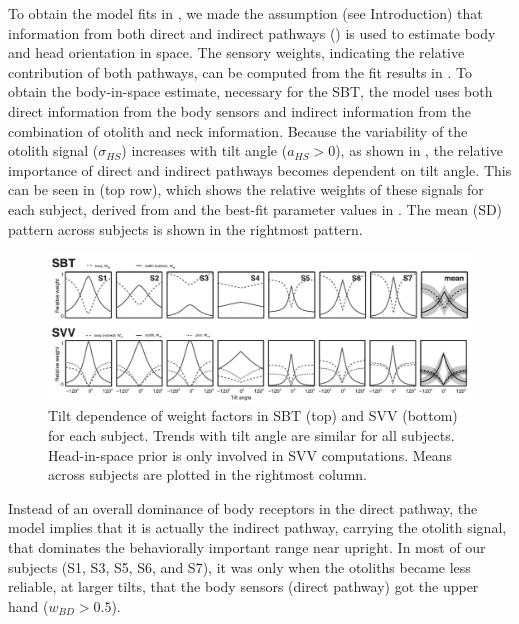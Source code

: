 To obtain the model fits in , we made the assumption (see Introduction) that information from both direct and indirect pathways () is used to estimate body and head orientation in space. The sensory weights, indicating the relative contribution of both pathways, can be computed from the fit results in . To obtain the body-in-space estimate, necessary for the SBT, the model uses both direct information from the body sensors and indirect information from the combination of otolith and neck information. Because the variability of the otolith signal ($\sigma_{HS}$) increases with tilt angle ($a_{HS} > 0$), as shown in , the relative importance of direct and indirect pathways becomes dependent on tilt angle. This can be seen in  (top row), which shows the relative weights of these signals for each subject, derived from  and the best-fit parameter values in . The mean (\textpm SD) pattern across subjects is shown in the rightmost pattern. 

\begin{figure}
    \includegraphics[width=1.0\textwidth]{src/paper1/figure5.pdf}
    
    \caption{Tilt dependence of weight factors in SBT (top) and SVV (bottom) for each subject. Trends with tilt angle are similar for all subjects. Head-in-space prior is only involved in SVV computations. Means across subjects are plotted in the rightmost column.}
    \label{p1:fig5}
\end{figure}

Instead of an overall dominance of body receptors in the direct pathway, the model implies that it is actually the indirect pathway, carrying the otolith signal, that dominates the behaviorally important range near upright. In most of our subjects (S1, S3, S5, S6, and S7), it was only when the otoliths became less reliable, at larger tilts, that the body sensors (direct pathway) got the upper hand ($w_{BD} > 0.5$). 

